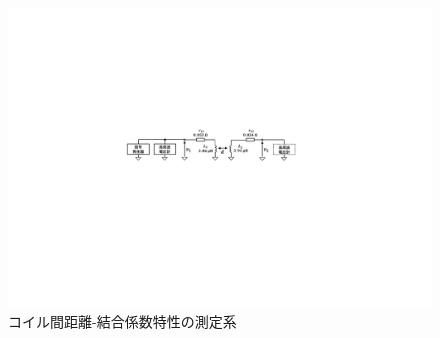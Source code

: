 \begin{figure}[h]
\begin{center}
\includegraphics[width=160mm]{figures/dvsk.pdf}
\caption{コイル間距離-結合係数特性の測定系}
\label{dvsk}
\end{center}
\end{figure}

